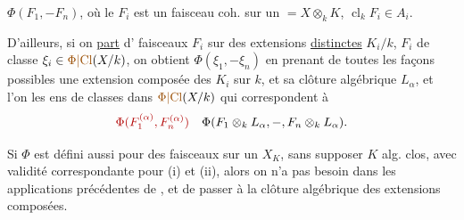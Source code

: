 $\Phi(F_1,-F_n)$, où le $F_i$ est un faisceau coh. sur un $=X\otimes_kK$,  $\operatorname{cl}_kF_i\in A_i$.

D'ailleurs, si on \uline{part} d' faisceaux  $F_i$ sur des extensions \uline{distinctes} $K_i/k$, $F_i$ de classe $\xi_i\in\unsure{\Phi|\mathrm{Cl}}(X/k)$, on obtient $\Phi(\xi_1,-\xi_n)$ en prenant de toutes les façons possibles une extension composée des $K_i$ sur $k$, et sa clôture algébrique  $L_\alpha$, et l'on  les ens de classes dans $\unsure{\Phi|\mathrm{Cl}}(X/k)$ qui correspondent à
\[
\deleted{\Phi(F_1^{(\alpha)},F_n^{(\alpha)})}\quad
\Phi(F_1\otimes_kL_\alpha,-,F_n\otimes_kL_\alpha).
\]

Si $\Phi$ est défini aussi pour des faisceaux sur un $X_K$, sans supposer $K$ alg. clos, avec validité correspondante pour (i) et (ii), alors on n'a pas besoin dans les applications précédentes de , et de passer à la clôture algébrique des extensions composées.
